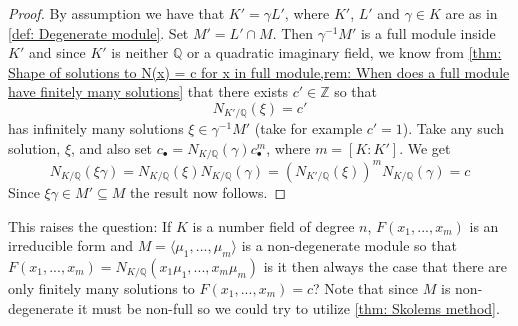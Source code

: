 \documentclass{article}
\newcommand{\mbb}[1]{\mathbb{#1}}
\numberwithin{equation}{section}
\begin{document}
\begin{proof}
    By assumption we have that $K' = \gamma L'$, where $K'$, $L'$ and $\gamma \in K$ are as in \cref{def: Degenerate module}. Set $M' = L' \cap M$. Then $\gamma^{-1}M'$ is a full module inside $K'$ and since $K'$ is neither $\mbb Q$ or a quadratic imaginary field, we know from \cref{thm: Shape of solutions to N(x) = c for x in full module,rem: When does a full module have finitely many solutions} that there exists $c' \in \mbb Z$ so that
    $$N_{K' / \mbb Q}(\xi) = c'$$
    has infinitely many solutions $\xi \in \gamma^{-1}M'$ (take for example $c' = 1$). Take any such solution, $\xi$, and also set $c_\bullet = N_{K / \mbb Q}(\gamma)c_\bullet^m$, where $m = [K : K']$. We get
    $$N_{K / \mbb Q}(\xi \gamma) = N_{K / \mbb Q}(\xi) N_{K / \mbb Q}(\gamma) = (N_{K' / \mbb Q}(\xi))^m N_{K / \mbb Q}(\gamma) = c$$
    Since $\xi\gamma \in M' \subseteq M$ the result now follows.
\end{proof}
This raises the question: If $K$ is a number field of degree $n$, $F(x_1, ..., x_m)$ is an irreducible form and $M = \langle\mu_1, ..., \mu_m \rangle$ is a non-degenerate module so that $F(x_1, ..., x_m) = N_{K/\mbb Q}(x_1\mu_1, ..., x_m\mu_m)$ is it then always the case that there are only finitely many solutions to  $F(x_1, ..., x_m) = c$? Note that since $M$ is non-degenerate it must be non-full so we could try to utilize \cref{thm: Skolems method}. 


\end{document}
